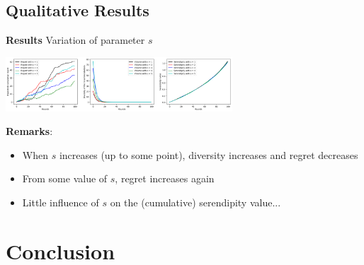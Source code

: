 \documentclass[10pt,frenchb]{beamer}
\begin{document}
\subsection{Qualitative Results}

\begin{frame}{\textbf{Results} Variation of parameter $s$}

\begin{center}
\includegraphics[width=320px]{../../Results/ml-20m/lagree.png}
\end{center}

\textbf{Remarks}:
\begin{itemize}
\item When $s$ increases (up to some point), diversity increases and regret decreases
\pause
\item From some value of $s$, regret increases again
\pause
\item Little influence of $s$ on the (cumulative) serendipity value...
\end{itemize}

\end{frame}

\section{Conclusion}

 \begin{frame}
 \tableofcontents[currentsection]
 \end{frame}
\end{document}
